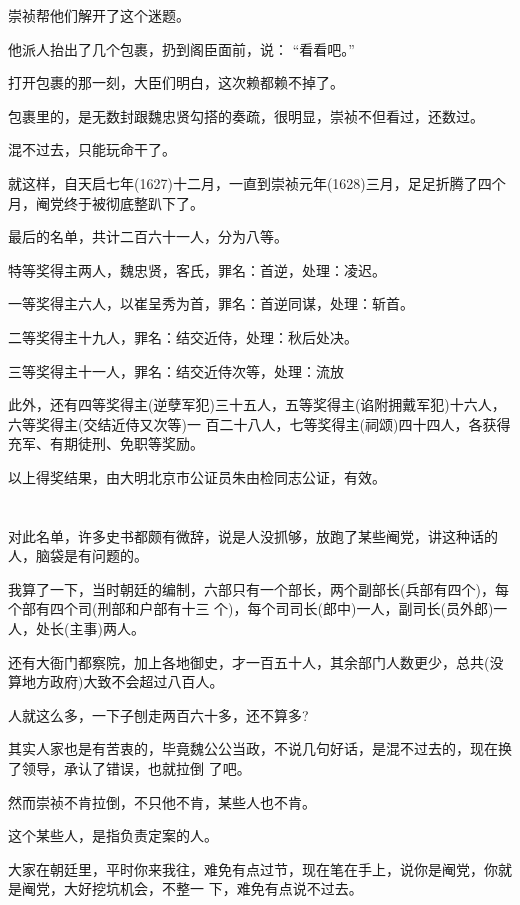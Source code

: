 \documentclass[11pt,a4paper,onecolumn]{article}
\begin{document}
崇祯帮他们解开了这个迷题。

他派人抬出了几个包裹，扔到阁臣面前，说： ``看看吧。''

打开包裹的那一刻，大臣们明白，这次赖都赖不掉了。

包裹里的，是无数封跟魏忠贤勾搭的奏疏，很明显，崇祯不但看过，还数过。

混不过去，只能玩命干了。

就这样，自天启七年(1627)十二月，一直到崇祯元年(1628)三月，足足折腾了四个月，阉党终于被彻底整趴下了。

最后的名单，共计二百六十一人，分为八等。

特等奖得主两人，魏忠贤，客氏，罪名：首逆，处理：凌迟。

一等奖得主六人，以崔呈秀为首，罪名：首逆同谋，处理：斩首。

二等奖得主十九人，罪名：结交近侍，处理：秋后处决。

三等奖得主十一人，罪名：结交近侍次等，处理：流放

此外，还有四等奖得主(逆孽军犯)三十五人，五等奖得主(谄附拥戴军犯)十六人，六等奖得主(交结近侍又次等)一
百二十八人，七等奖得主(祠颂)四十四人，各获得充军、有期徒刑、免职等奖励。

以上得奖结果，由大明北京市公证员朱由检同志公证，有效。

\section[\thesection]{}

对此名单，许多史书都颇有微辞，说是人没抓够，放跑了某些阉党，讲这种话的人，脑袋是有问题的。

我算了一下，当时朝廷的编制，六部只有一个部长，两个副部长(兵部有四个)，每个部有四个司(刑部和户部有十三
个)，每个司司长(郎中)一人，副司长(员外郎)一人，处长(主事)两人。

还有大衙门都察院，加上各地御史，才一百五十人，其余部门人数更少，总共(没算地方政府)大致不会超过八百人。

人就这么多，一下子刨走两百六十多，还不算多?

其实人家也是有苦衷的，毕竟魏公公当政，不说几句好话，是混不过去的，现在换了领导，承认了错误，也就拉倒
了吧。

然而崇祯不肯拉倒，不只他不肯，某些人也不肯。

这个某些人，是指负责定案的人。

大家在朝廷里，平时你来我往，难免有点过节，现在笔在手上，说你是阉党，你就是阉党，大好挖坑机会，不整一
下，难免有点说不过去。
\end{document}
